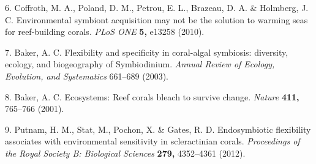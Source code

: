 \documentclass[]{article}
\begin{document}
\hypertarget{ref-Coffroth:2010ju}{}
6. Coffroth, M. A., Poland, D. M., Petrou, E. L., Brazeau, D. A. \&
Holmberg, J. C. Environmental symbiont acquisition may not be the
solution to warming seas for reef-building corals. \emph{PLoS ONE}
\textbf{5,} e13258 (2010).

\hypertarget{ref-Baker:2003uo}{}
7. Baker, A. C. Flexibility and specificity in coral-algal symbiosis:
diversity, ecology, and biogeography of Symbiodinium. \emph{Annual
Review of Ecology, Evolution, and Systematics} 661--689 (2003).

\hypertarget{ref-Baker:2001bf}{}
8. Baker, A. C. Ecosystems: Reef corals bleach to survive change.
\emph{Nature} \textbf{411,} 765--766 (2001).

\hypertarget{ref-Putnam:2012bn}{}
9. Putnam, H. M., Stat, M., Pochon, X. \& Gates, R. D. Endosymbiotic
flexibility associates with environmental sensitivity in scleractinian
corals. \emph{Proceedings of the Royal Society B: Biological Sciences}
\textbf{279,} 4352--4361 (2012).
\end{document}
